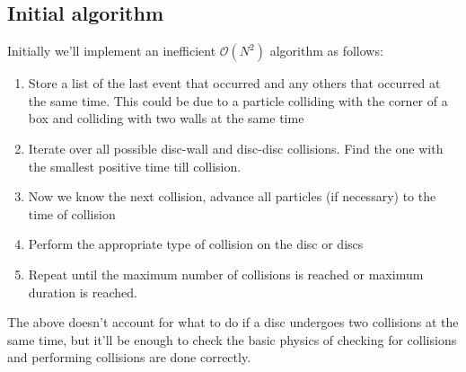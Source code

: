 \documentclass{article}
\begin{document}
\subsection{Initial algorithm}
Initially we'll implement an inefficient $\mathcal{O}(N^2)$ algorithm as follows:
\begin{enumerate}
    \item Store a list of the last event that occurred and any others that occurred at the same time. This could be due to a particle colliding with the corner of a box and colliding with two walls at the same time
    \item Iterate over all possible disc-wall and disc-disc collisions. Find the one with the smallest positive time till collision.
    \item Now we know the next collision, advance all particles (if necessary) to the time of collision
    \item Perform the appropriate type of collision on the disc or discs
    \item Repeat until the maximum number of collisions is reached or maximum duration is reached.
\end{enumerate}
The above doesn't account for what to do if a disc undergoes two collisions at the same time, but it'll be enough to check the basic physics of checking for collisions and performing collisions are done correctly.
\end{document}
